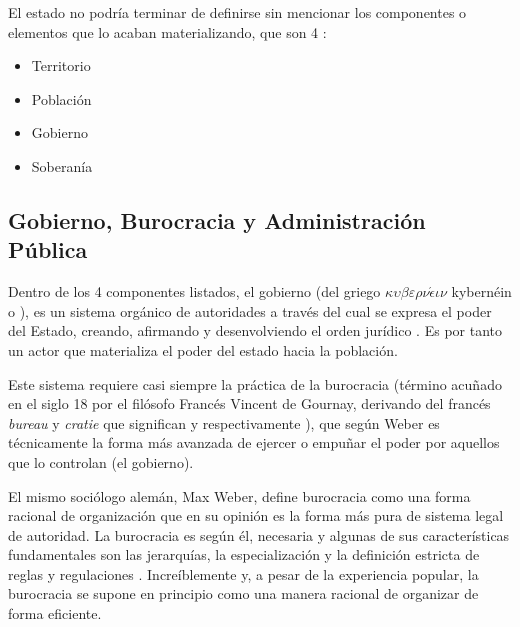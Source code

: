 El estado no podría terminar de definirse sin mencionar los componentes o elementos que lo acaban materializando, que son 4 \cite{delarocharadaElementosParaTeoria2019}:

\begin{itemize}
    \item Territorio
    \item Población
    \item Gobierno
    \item Soberanía
\end{itemize}

\subsection{Gobierno, Burocracia y Administración Pública}

Dentro de los 4 componentes listados, el gobierno
(del griego $\kappa \upsilon \beta \varepsilon \rho \nu \acute{\epsilon} \iota \nu$ kybernéin  o ),
es un sistema orgánico de autoridades a través del cual se expresa el poder del Estado, creando, afirmando y desenvolviendo el orden jurídico \cite{fernandezruizDerechoParlamentario2023}.
Es por tanto un actor que materializa el poder del estado hacia la población.

Este sistema requiere casi siempre la práctica de la burocracia
(término acuñado en el siglo 18 por el filósofo Francés Vincent de Gournay, derivando del francés \textit{bureau} y \textit{cratie} que significan  y  respectivamente \cite{rockmanBureaucracyStructureProcesses2024}),
que según Weber es técnicamente la forma más avanzada de ejercer o empuñar el poder por aquellos que lo controlan \cite[114]{watersWeberRationalismModern2015} (el gobierno).

El mismo sociólogo alemán, Max Weber, define burocracia como una forma racional de organización que en su opinión es la forma más pura de sistema legal de autoridad.
La burocracia es según él, necesaria y algunas de sus características fundamentales son las jerarquías, la especialización y la definición estricta de reglas y regulaciones \cite{archerDictionaryPublicAdministration2022}.
Increíblemente y, a pesar de la experiencia popular, la burocracia se supone en principio como una manera racional de organizar de forma eficiente.

